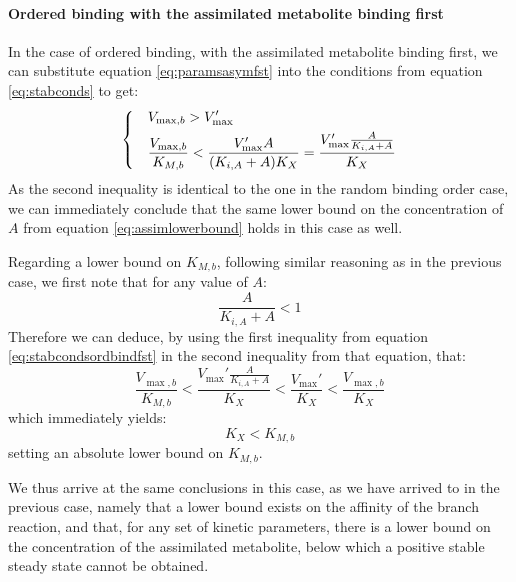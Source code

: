   \paragraph{Ordered binding with the assimilated metabolite binding first}
  In the case of ordered binding, with the assimilated metabolite binding first, we can substitute equation \ref{eq:paramsasymfst} into the conditions from equation \ref{eq:stabconds} to get:
  \begin{equation}
    \label{eq:stabcondsordbindfst}
    \begin{dcases}
      & V_{\max,b}>V_{\max}' \\
      & \frac{V_{\max,b}}{K_{M,b}}<\frac{V_{\max}'A}{(K_{i,A}+A)K_X}=\frac{V_{\max}'\frac{A}{K_{i,A}+A}}{K_X}
    \end{dcases}
  \end{equation}
  As the second inequality is identical to the one in the random binding order case, we can immediately conclude that the same lower bound on the concentration of $A$ from equation \ref{eq:assimlowerbound} holds in this case as well.

  Regarding a lower bound on $K_{M,b}$, following similar reasoning as in the previous case, we first note that for any value of $A$: 
  \begin{equation*}
    \frac{A}{K_{i,A}+A}<1
  \end{equation*}
  Therefore we can deduce, by using the first inequality from equation \ref{eq:stabcondsordbindfst} in the second inequality from that equation, that:
  \begin{equation*}
    \frac{V_{\max,b}}{K_{M,b}}<\frac{V_{\max}'\frac{A}{K_{i,A}+A}}{K_X}<\frac{V_{\max}'}{K_X}<\frac{V_{\max,b}}{K_X}
  \end{equation*}
  which immediately yields:
  \begin{equation*}
    K_X<K_{M,b}
  \end{equation*}
  setting an absolute lower bound on $K_{M,b}$.

  We thus arrive at the same conclusions in this case, as we have arrived to in the previous case, namely that a lower bound exists on the affinity of the branch reaction, and that, for any set of kinetic parameters, there is a lower bound on the concentration of the assimilated metabolite, below which a positive stable steady state cannot be obtained.

